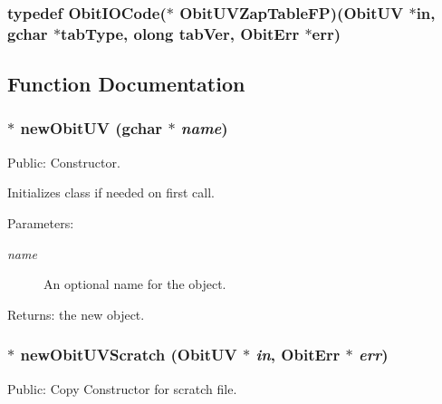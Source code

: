 \subsubsection{\setlength{\rightskip}{0pt plus 5cm}typedef Obit\-IOCode($\ast$ {\bf Obit\-UVZap\-Table\-FP})({\bf Obit\-UV} $\ast$in, gchar $\ast$tab\-Type, {\bf olong} tab\-Ver, {\bf Obit\-Err} $\ast$err)}\label{ObitUV_8h_a19}




\subsection{Function Documentation}
\subsubsection{$\ast$ new\-Obit\-UV (gchar $\ast$ {\em name})}\label{ObitUV_8h_a24}


Public: Constructor. 

Initializes class if needed on first call. \begin{Desc}
\item[Parameters:]
\begin{description}
\item[{\em name}]An optional name for the object. \end{description}
\end{Desc}
\begin{Desc}
\item[Returns:]the new object. \end{Desc}
\subsubsection{$\ast$ new\-Obit\-UVScratch ({\bf Obit\-UV} $\ast$ {\em in}, {\bf Obit\-Err} $\ast$ {\em err})}\label{ObitUV_8h_a26}


Public: Copy Constructor for scratch file. 

